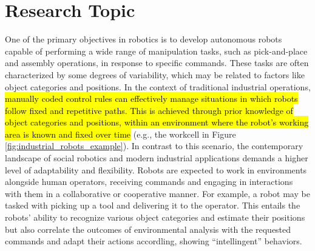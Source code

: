 \section{Research Topic}
\label{sec:research_topic}
One of the primary objectives in robotics is to develop autonomous robots capable of performing a wide range of manipulation tasks, such as pick-and-place and assembly operations, in response to specific commands. These tasks are often characterized by some degrees of variability, which may be related to factors like object categories and positions.
\newline In the context of traditional industrial operations, \hl{manually coded control rules can effectively manage situations in which robots follow fixed and repetitive paths. This is achieved through prior knowledge of object categories and positions, within an environment where the robot's working area is known and fixed over time}  (e.g., the workcell in Figure \ref{fig:industrial_robots_example}).
In contrast to this scenario, the contemporary landscape of social robotics and modern industrial applications demands a higher level of adaptability and flexibility. Robots are expected to work in environments alongside human operators, receiving commands and engaging in interactions with them in a collaborative or cooperative manner. For example, a robot may be tasked with picking up a tool and delivering it to the operator. This entails the robots' ability to recognize various object categories and estimate their positions but also correlate the outcomes of environmental analysis with the requested commands and adapt their actions accordling, showing ``intellingent'' behaviors.

